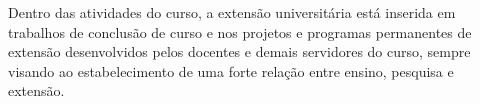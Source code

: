 Dentro das atividades do curso, a extensão universitária está inserida em trabalhos de conclusão de curso e nos projetos e programas permanentes de extensão desenvolvidos pelos docentes e demais servidores do curso, sempre visando ao estabelecimento de uma forte relação entre ensino, pesquisa e extensão.

